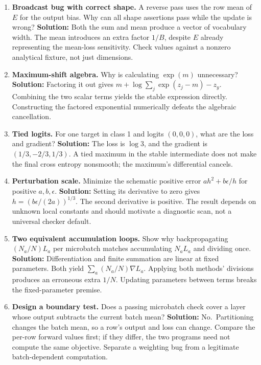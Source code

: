 \begin{enumerate}
  that a genomic model is causal or scientifically useful?
  \textbf{Solution:} No.~A function can have perfectly correct
  derivatives while reading forbidden future tokens or optimizing a
  shortcut. Parameter-derivative correctness, information access and
  empirical evidence are separate obligations.
\item
  \textbf{Broadcast bug with correct shape.} A reverse pass uses the row
  mean of \(E\) for the output bias. Why can all shape assertions pass
  while the update is wrong? \textbf{Solution:} Both the sum and mean
  produce a vector of vocabulary width. The mean introduces an extra
  factor \(1/B\), despite \(E\) already representing the mean-loss
  sensitivity. Check values against a nonzero analytical fixture, not
  just dimensions.
\item
  \textbf{Maximum-shift algebra.} Why is calculating \(\exp(m)\)
  unnecessary? \textbf{Solution:} Factoring it out gives
  \(m+\log\sum_j\exp(z_j-m)-z_y\). Combining the two scalar terms yields
  the stable expression directly. Constructing the factored exponential
  numerically defeats the algebraic cancellation.
\item
  \textbf{Tied logits.} For one target in class 1 and logits
  \((0,0,0)\), what are the loss and gradient? \textbf{Solution:} The
  loss is \(\log 3\), and the gradient is \((1/3,-2/3,1/3)\). A tied
  maximum in the stable intermediate does not make the final cross
  entropy nonsmooth; the maximum's differential cancels.
\item
  \textbf{Perturbation scale.} Minimize the schematic positive error
  \(ah^2+b\epsilon/h\) for positive \(a,b,\epsilon\). \textbf{Solution:}
  Setting its derivative to zero gives \(h=(b\epsilon/(2a))^{1/3}\). The
  second derivative is positive. The result depends on unknown local
  constants and should motivate a diagnostic scan, not a universal
  checker default.
\item
  \textbf{Two equivalent accumulation loops.} Show why backpropagating
  \((N_a/N)L_a\) per microbatch matches accumulating \(N_aL_a\) and
  dividing once. \textbf{Solution:} Differentiation and finite summation
  are linear at fixed parameters. Both yield
  \(\sum_a(N_a/N)\nabla L_a\). Applying both methods' divisions produces
  an erroneous extra \(1/N\). Updating parameters between terms breaks
  the fixed-parameter premise.
\item
  \textbf{Design a boundary test.} Does a passing microbatch check cover
  a layer whose output subtracts the current batch mean?
  \textbf{Solution:} No.~Partitioning changes the batch mean, so a row's
  output and loss can change. Compare the per-row forward values first;
  if they differ, the two programs need not compute the same objective.
  Separate a weighting bug from a legitimate batch-dependent
  computation.
\end{enumerate}

